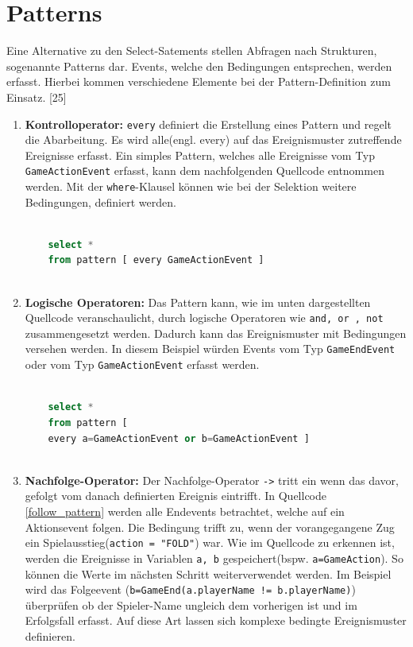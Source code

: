 \section{Patterns}

Eine Alternative zu den Select-Satements stellen Abfragen nach Strukturen, sogenannte Patterns dar. Events, welche den Bedingungen entsprechen, werden erfasst. Hierbei kommen verschiedene Elemente bei der Pattern-Definition zum Einsatz.
\cite{EsperRef2018}[25]

\begin{enumerate}
	\item \textbf{Kontrolloperator:} \texttt{every} definiert die Erstellung eines Pattern und regelt die Abarbeitung. Es wird alle(engl. every) auf das Ereignismuster zutreffende Ereignisse erfasst. Ein simples Pattern, welches alle Ereignisse vom Typ \texttt{GameActionEvent} erfasst, kann dem nachfolgenden Quellcode entnommen werden.
	Mit der \texttt{where}-Klausel können wie bei der Selektion weitere Bedingungen, definiert werden.
	
	\begin{lstlisting}[caption={Einfaches Pattern mit Where-Klausel},label=basic_pattern, captionpos=b,language=SQL]

	select *
	from pattern [ every GameActionEvent ]
	
	\end{lstlisting}
	
	\item \textbf{Logische Operatoren:} 
	Das Pattern kann, wie im unten dargestellten Quellcode veranschaulicht, durch logische Operatoren wie \texttt{and, or , not} zusammengesetzt werden. Dadurch kann das Ereignismuster mit Bedingungen versehen werden. In diesem Beispiel würden Events vom Typ \texttt{GameEndEvent} oder vom Typ \texttt{GameActionEvent} erfasst werden.
	
	\begin{lstlisting}[caption={Pattern mit logischen Operatoren},label=logic_pattern,captionpos=b,language=SQL]
	
	select *
	from pattern [
	every a=GameActionEvent or b=GameActionEvent ]
	
	\end{lstlisting}
	
	\item \textbf{Nachfolge-Operator:}
	Der Nachfolge-Operator \texttt{->} tritt ein wenn das davor, gefolgt vom danach definierten Ereignis eintrifft. In Quellcode \ref{follow_pattern}  werden alle Endevents betrachtet, welche auf ein Aktionsevent folgen. Die Bedingung trifft zu, wenn der vorangegangene Zug ein Spielausstieg(\texttt{action = "FOLD"}) war.
	Wie im Quellcode zu erkennen ist, werden die Ereignisse in Variablen \texttt{a, b} gespeichert(bspw. \texttt{a=GameAction}). So können die Werte im nächsten Schritt weiterverwendet werden. Im Beispiel wird das Folgeevent (\texttt{b=GameEnd(a.playerName != b.playerName)}) überprüfen ob der Spieler-Name ungleich dem vorherigen ist und im Erfolgsfall erfasst. Auf diese Art lassen sich komplexe bedingte Ereignismuster definieren.
	

\end{enumerate}

